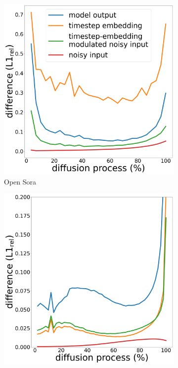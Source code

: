\begin{figure}
    \centering
    \begin{minipage}{0.8\textwidth}
    \centering
    \begin{subfigure}{0.3\textwidth}
        \centering 
        \includegraphics[width=\textwidth]{figs/opensora_inference_difference_crop_5.png}
        \caption{Open Sora}
    \end{subfigure}
    \hfill
    \begin{subfigure}{0.3\textwidth}
        \centering
        \includegraphics[width=\textwidth]{figs/latte_inference_difference_crop_4.png} 

\end{subfigure}
\end{minipage}
\end{figure}
